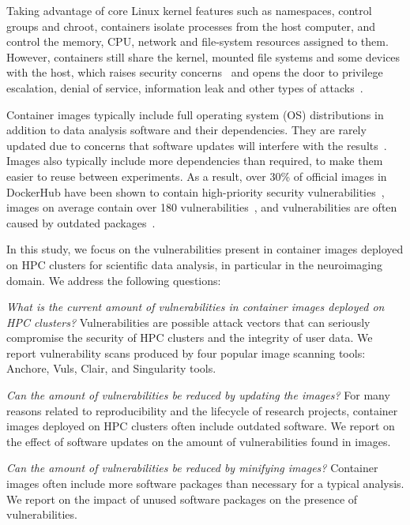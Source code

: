 \documentclass[a4paper,num-refs]{oup-contemporary}
\begin{document}
Taking advantage of core Linux kernel features such as namespaces, control
groups and chroot, containers isolate processes from the host computer, and
control the memory, CPU, network and file-system resources assigned to
them. However, containers still share the kernel, mounted file systems and
some devices with the host, which raises security
concerns~\cite{martin2018docker, sultan2019container, combe2016docker} and
opens the door to privilege escalation, denial of service, information leak
and other types of attacks~\cite{gantikow2016providing}. 

Container images typically include full operating system (OS) distributions in
addition to data analysis software and their dependencies. They are rarely
updated due to concerns that software updates will interfere with
the results~\cite{gronenschild2012effects, glatard2015reproducibility}.
Images also typically include more dependencies than required, to make them
easier to reuse between experiments. As a result, over 30\% of official
images in DockerHub have been shown to contain high-priority security
vulnerabilities~\cite{gummaraju2015over}, images on average contain over
180 vulnerabilities~\cite{Shu2017}, and vulnerabilities are often caused by
outdated packages~\cite{zerouali2019relation}.

In this study, we focus on the vulnerabilities present in container images
deployed on HPC clusters for scientific data analysis, in particular in the
neuroimaging domain. We address the following questions:

\textit{What is the current amount of vulnerabilities in
container images deployed on HPC clusters?} Vulnerabilities are possible
attack vectors that can seriously compromise the security of HPC clusters
and the integrity of user data. We report vulnerability scans produced
by four popular image scanning tools: Anchore, Vuls, Clair, and Singularity tools.

\textit{Can the amount of vulnerabilities be reduced by updating the images?}  
For many reasons related to reproducibility and the lifecycle of research
projects, container images deployed on HPC clusters often include outdated
software. We report on the effect of software updates on the amount of
vulnerabilities found in images.

\textit{Can the amount of vulnerabilities be reduced by minifying images?} 
Container images often include more software packages than necessary for 
a typical analysis. We report on the impact of unused software packages on
the presence of vulnerabilities.
\end{document}
